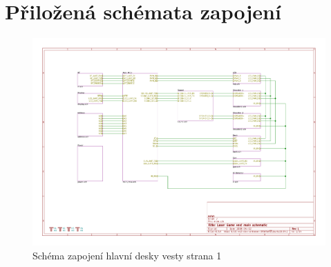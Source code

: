 \chapter*{Přiložená schémata zapojení}

\begin{landscape}
    \begin{figure}[h]
        \centering
        \includegraphics[page=1, height=\textwidth]{sch/main}
        \caption{Schéma zapojení hlavní desky vesty strana 1}
    \end{figure}
\end{landscape}
